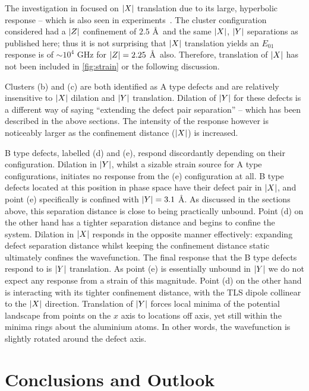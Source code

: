 The investigation in  focused on $\lvert X\rvert$ translation due to its large, hyperbolic response -- which is also seen in experiments~\cite{Grabovskij2012}.
The cluster configuration considered had a $\lvert Z\rvert$ confinement of $2.5$ \AA\ and the same $\lvert X\rvert$, $\lvert Y\rvert$ separations as published here; thus it is not surprising that $\lvert X\rvert$ translation yields an $E_{01}$ response is of $\sim\!10^4$ GHz for $\lvert Z\rvert = 2.25$ \AA\ also.
Therefore, translation of $\lvert X\rvert$ has not been included in \cref{fig:strain} or the following discussion.

Clusters (b) and (c) are both identified as A type defects and are relatively insensitive to $\lvert X\rvert$ dilation and $\lvert Y\rvert$ translation.
Dilation of $\lvert Y\rvert$ for these defects is a different way of saying ``extending the defect pair separation'' -- which has been described in the above sections.
The intensity of the response however is noticeably larger as the confinement distance ($\lvert X\rvert$) is increased.

B type defects, labelled (d) and (e), respond discordantly depending on their configuration.
Dilation in $\lvert Y\rvert$, whilst a sizable strain source for A type configurations, initiates no response from the (e) configuration at all.
B type defects located at this position in phase space have their defect pair in $\lvert X\rvert$, and point (e) specifically is confined with $\lvert Y\rvert = 3.1$ \AA.
As discussed in the sections above, this separation distance is close to being practically unbound.
Point (d) on the other hand has a tighter separation distance and begins to confine the system.
Dilation in $\lvert X\rvert$ responds in the opposite manner effectively: expanding defect separation distance whilst keeping the confinement distance static ultimately confines the wavefunction.
The final response that the B type defects respond to is $\lvert Y\rvert$ translation.
As point (e) is essentially unbound in $\lvert Y\rvert$ we do not expect any response from a strain of this magnitude.
Point (d) on the other hand is interacting with its tighter confinement distance, with the TLS dipole collinear to the $\lvert X\rvert$ direction.
Translation of $\lvert Y\rvert$ forces local minima of the potential landscape from points on the $x$ axis to locations off axis, yet still within the minima rings about the aluminium atoms.
In other words, the wavefunction is slightly rotated around the defect axis.

\section{Conclusions and Outlook}

